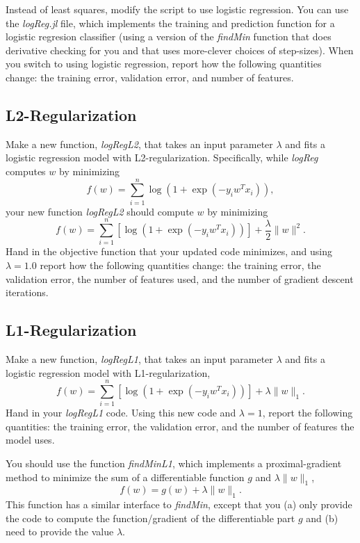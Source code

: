 \documentclass{article}
\def\blu#1{{\color{blu}#1}}
\def\norm#1{\|#1\|}
\begin{document}
Instead of least squares, modify the script to use logistic regression. You can use the \emph{logReg.jl} file, which implements the training and prediction function for a logistic regresion classifier (using a  version of the \emph{findMin} function that does derivative checking for you and that uses more-clever choices of step-sizes). When you switch to using logistic regression, \blu{report how the following quantities change: the training error, validation error, and number of features}.

\subsection{L2-Regularization}

Make a new function, \emph{logRegL2}, that takes an input parameter $\lambda$ and fits a logistic regression model with L2-regularization. Specifically, while \emph{logReg} computes $w$ by minimizing
\[
f(w) = \sum_{i=1}^n \log(1+\exp(-y_iw^Tx_i)),
\]
your new function \emph{logRegL2} should compute $w$ by minimizing
\[
f(w) = \sum_{i=1}^n \left[\log(1+\exp(-y_iw^Tx_i))\right] + \frac{\lambda}{2}\norm{w}^2.
\]
\blu{Hand in the objective function that your updated code minimizes, and using $\lambda=1.0$ report how the following quantities change: the training error, the validation error, the number of features used, and the number of gradient descent iterations.}




\subsection{L1-Regularization}

Make a new function, \emph{logRegL1}, that takes an input parameter $\lambda$ and fits a logistic regression model with L1-regularization,
\[
f(w) = \sum_{i=1}^n \left[\log(1+\exp(-y_iw^Tx_i))\right] + \lambda\norm{w}_1.
\]
\blu{Hand in your \emph{logRegL1} code. Using this new code and $\lambda=1$, report the following quantities: the training error, the validation error, and the number of features the model uses.}


You should use the function \emph{findMinL1}, which implements a proximal-gradient method to minimize the sum of a differentiable function $g$ and $\lambda\norm{w}_1$,
\[
f(w) = g(w) + \lambda \norm{w}_1.
\]
 This function has a similar interface to \emph{findMin}, except that you (a) only provide the code to compute the function/gradient of the differentiable part $g$ and (b) need to provide the value $\lambda$. 
\end{document}
